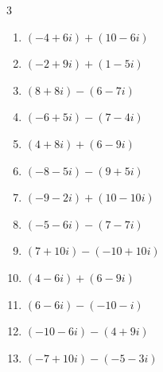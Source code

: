 \begin{multicols}{3}
\begin{enumerate}
  \item $\displaystyle (-4+6i) + (10-6i)$

        \phantom{$\displaystyle =6$}

  \item $\displaystyle (-2+9i) + (1-5i)$

        \phantom{$\displaystyle =-1+4i$}

  \item $\displaystyle (8+8i) - (6-7i)$

        \phantom{$\displaystyle =2+15i$}

  \item $\displaystyle (-6+5i) - (7-4i)$

        \phantom{$\displaystyle =-13+9i$}

  \item $\displaystyle (4+8i) + (6-9i)$

        \phantom{$\displaystyle =10-i$}

  \item $\displaystyle (-8-5i) - (9+5i)$

        \phantom{$\displaystyle =-17-10i$}

  \item $\displaystyle (-9-2i) + (10-10i)$

        \phantom{$\displaystyle =1-12i$}

  \item $\displaystyle (-5-6i) - (7-7i)$

        \phantom{$\displaystyle =-12+i$}

  \item $\displaystyle (7+10i) - (-10+10i)$

        \phantom{$\displaystyle =17$}

  \item $\displaystyle (4-6i) + (6-9i)$

        \phantom{$\displaystyle =10-15i$}

  \item $\displaystyle (6-6i) - (-10-i)$

        \phantom{$\displaystyle =16-5i$}

  \item $\displaystyle (-10-6i) - (4+9i)$

        \phantom{$\displaystyle =-14-15i$}

  \item $\displaystyle (-7+10i) - (-5-3i)$

        \phantom{$\displaystyle =-2+13i$}


\end{enumerate}
\end{multicols}
